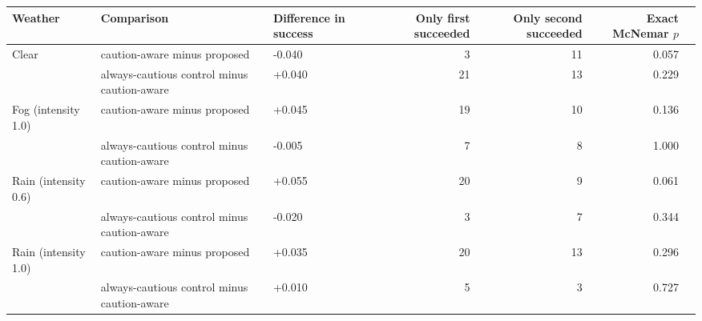 \begin{tabular}{@{}lllrrrr@{}}\toprule
Weather & Comparison & Difference in success & Only first succeeded & Only second succeeded & Exact McNemar $p$\\\midrule
Clear & caution-aware minus proposed & -0.040 & 3 & 11 & 0.057\\
 & always-cautious control minus caution-aware & +0.040 & 21 & 13 & 0.229\\
\midrule
Fog (intensity 1.0) & caution-aware minus proposed & +0.045 & 19 & 10 & 0.136\\
 & always-cautious control minus caution-aware & -0.005 & 7 & 8 & 1.000\\
\midrule
Rain (intensity 0.6) & caution-aware minus proposed & +0.055 & 20 & 9 & 0.061\\
 & always-cautious control minus caution-aware & -0.020 & 3 & 7 & 0.344\\
\midrule
Rain (intensity 1.0) & caution-aware minus proposed & +0.035 & 20 & 13 & 0.296\\
 & always-cautious control minus caution-aware & +0.010 & 5 & 3 & 0.727\\
\bottomrule\end{tabular}
